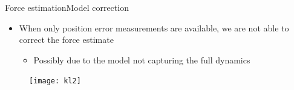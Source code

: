 \begin{frame}{Force estimation}{Model correction}
\begin{itemize}
\item When only position error measurements are available, we are not able to correct the force estimate
\begin{itemize}
\item Possibly due to the model not capturing the full dynamics
\end{itemize}
\end{itemize}
\begin{figure}
\centering
\texttt{[image: kl2]}
\end{figure}
\end{frame}



